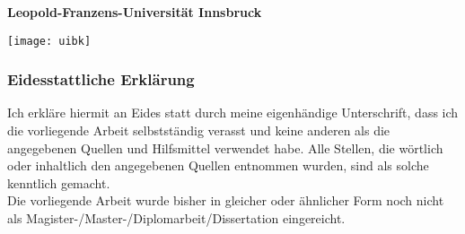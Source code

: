 \begin{titlepage}
    \textbf{Leopold-Franzens-Universit\"at Innsbruck}
    \hfill\begin{minipage}{.15\textwidth}
        \centering
        \texttt{[image: uibk]}
    \end{minipage}

    \subsubsection*{Eidesstattliche Erklärung}
    Ich erkläre hiermit an Eides statt durch meine eigenhändige Unterschrift, dass ich die vorliegende Arbeit selbstständig verasst und keine anderen als die angegebenen Quellen und Hilfsmittel verwendet habe.
    Alle Stellen, die wörtlich oder inhaltlich den angegebenen Quellen entnommen wurden, sind als solche kenntlich gemacht.\\
    [0.5cm]
    Die vorliegende Arbeit wurde bisher in gleicher oder ähnlicher Form noch nicht als Magister-/Master-/Diplomarbeit/Dissertation eingereicht.\\
    [1cm]


    \begin{figure}[h!]
        \hfill
    \end{figure}
\end{titlepage}
